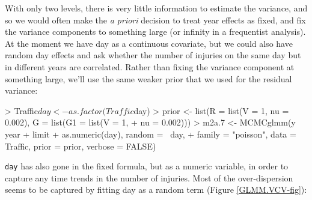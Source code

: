 \documentclass{article}
\begin{document}
With only two levels, there is very little information to estimate the variance, and so we would often make the \emph{a priori} decision to treat year effects as fixed, and fix the variance components to something large (or infinity in a frequentist analysis).\\

At the moment we have day as a continuous covariate, but we could also have random day effects and ask whether the number of injuries on the same day but in different years are correlated. Rather than fixing the variance component at something large, we'll use the same weaker prior that we used for the residual variance:

\begin{Schunk}
\begin{Sinput}
> Traffic$day <- as.factor(Traffic$day)
> prior <- list(R = list(V = 1, nu = 0.002), G = list(G1 = list(V = 1, 
+     nu = 0.002)))
> m2a.7 <- MCMCglmm(y ~ year + limit + as.numeric(day), random = ~day, 
+     family = "poisson", data = Traffic, prior = prior, verbose = FALSE)
\end{Sinput}
\end{Schunk}

\texttt{day} has also gone in the fixed formula, but as a numeric variable, in order to capture any time trends in the number of injuries. Most of the over-dispersion seems to be captured by fitting day as a random term (Figure \ref{GLMM.VCV-fig}):

\begin{Schunk}
\end{Schunk}
\end{document}
